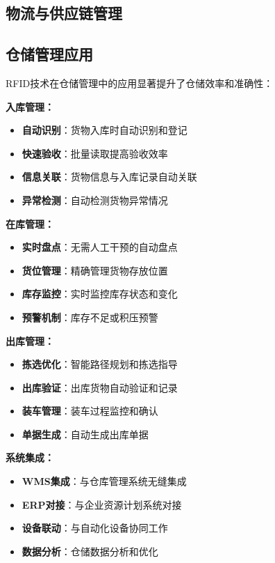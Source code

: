 \documentclass[12pt,UTF8]{ctexbook}
\begin{document}
\begin{itemize}[leftmargin=3.5em]
\begin{itemize}[leftmargin=3.5em]
\chapter{物流与供应链管理}

\section{仓储管理应用}

RFID技术在仓储管理中的应用显著提升了仓储效率和准确性：

\textbf{入库管理：}
\begin{itemize}[leftmargin=3.5em]
    \item \textbf{自动识别}：货物入库时自动识别和登记
    \item \textbf{快速验收}：批量读取提高验收效率
    \item \textbf{信息关联}：货物信息与入库记录自动关联
    \item \textbf{异常检测}：自动检测货物异常情况
\end{itemize}

\textbf{在库管理：}
\begin{itemize}[leftmargin=3.5em]
    \item \textbf{实时盘点}：无需人工干预的自动盘点
    \item \textbf{货位管理}：精确管理货物存放位置
    \item \textbf{库存监控}：实时监控库存状态和变化
    \item \textbf{预警机制}：库存不足或积压预警
\end{itemize}

\textbf{出库管理：}
\begin{itemize}[leftmargin=3.5em]
    \item \textbf{拣选优化}：智能路径规划和拣选指导
    \item \textbf{出库验证}：出库货物自动验证和记录
    \item \textbf{装车管理}：装车过程监控和确认
    \item \textbf{单据生成}：自动生成出库单据
\end{itemize}

\textbf{系统集成：}
\begin{itemize}[leftmargin=3.5em]
    \item \textbf{WMS集成}：与仓库管理系统无缝集成
    \item \textbf{ERP对接}：与企业资源计划系统对接
    \item \textbf{设备联动}：与自动化设备协同工作
    \item \textbf{数据分析}：仓储数据分析和优化
\end{itemize}


\end{itemize}
\end{itemize}
\end{document}
